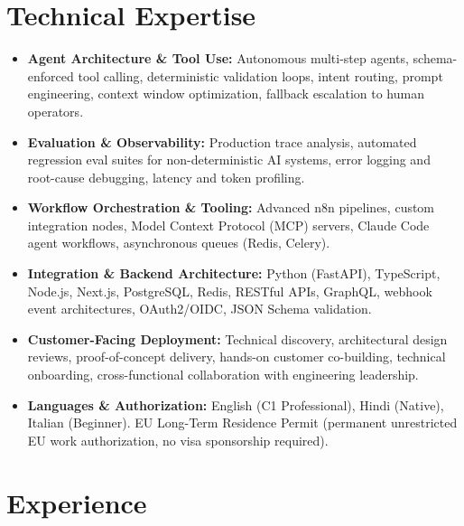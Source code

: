 \documentclass[10pt,a4paper]{article}
\begin{document}
\section{Technical Expertise}
\begin{itemize}
  \item \textbf{Agent Architecture \& Tool Use:} Autonomous multi-step agents, schema-enforced tool calling, deterministic validation loops, intent routing, prompt engineering, context window optimization, fallback escalation to human operators.
  \item \textbf{Evaluation \& Observability:} Production trace analysis, automated regression eval suites for non-deterministic AI systems, error logging and root-cause debugging, latency and token profiling.
  \item \textbf{Workflow Orchestration \& Tooling:} Advanced n8n pipelines, custom integration nodes, Model Context Protocol (MCP) servers, Claude Code agent workflows, asynchronous queues (Redis, Celery).
  \item \textbf{Integration \& Backend Architecture:} Python (FastAPI), TypeScript, Node.js, Next.js, PostgreSQL, Redis, RESTful APIs, GraphQL, webhook event architectures, OAuth2/OIDC, JSON Schema validation.
  \item \textbf{Customer-Facing Deployment:} Technical discovery, architectural design reviews, proof-of-concept delivery, hands-on customer co-building, technical onboarding, cross-functional collaboration with engineering leadership.
  \item \textbf{Languages \& Authorization:} English (C1 Professional), Hindi (Native), Italian (Beginner). EU Long-Term Residence Permit (permanent unrestricted EU work authorization, no visa sponsorship required).
\end{itemize}

\section{Experience}
\end{document}
